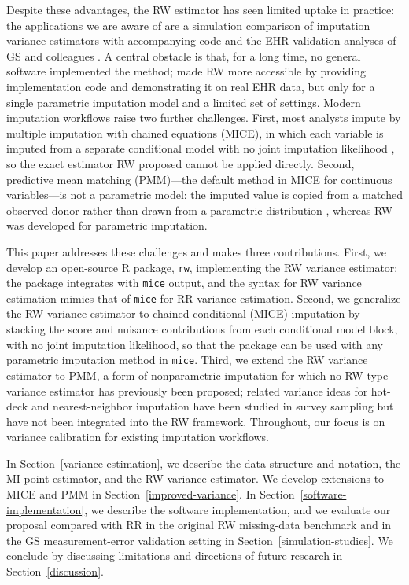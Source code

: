 Despite these advantages, the RW estimator has seen limited uptake in
practice: the applications we are aware of are a simulation comparison
of imputation variance estimators with accompanying code
\citep{hughes2016comparison} and the EHR validation analyses of GS and
colleagues \citep{giganti2020dependent, giganti2020multiple}.  A
central obstacle is that, for a long time, no general software
implemented the method; \citet{giganti2020multiple} made RW more
accessible by providing implementation code and demonstrating it on
real EHR data, but only for a single parametric imputation model and a
limited set of settings.  Modern imputation workflows raise two
further challenges.  First, most analysts impute by multiple
imputation with chained equations (MICE), in which each variable is
imputed from a separate conditional model with no joint imputation
likelihood \citep{vanbuuren2011mice}, so the exact estimator RW proposed
cannot be applied directly.  Second, predictive mean matching
(PMM)---the default method in MICE for continuous variables---is not a
parametric model: the imputed value is copied from a matched observed
donor rather than drawn from a parametric distribution
\citep{schenker1995partially, andridge2010review}, whereas RW was
developed for parametric imputation.

This paper addresses these challenges and makes three contributions.
First, we develop an open-source \textsf{R} package, \texttt{rw},
implementing the RW variance estimator; the package integrates with
\texttt{mice} output, and the syntax for RW variance estimation mimics
that of \texttt{mice} for RR variance estimation.  Second, we
generalize the RW variance estimator to chained conditional (MICE)
imputation by stacking the score and nuisance contributions from each
conditional model block, with no joint imputation likelihood, so that
the package can be used with any parametric imputation method in
\texttt{mice}.  Third, we extend the RW variance estimator to PMM, a
form of nonparametric imputation for which no RW-type variance
estimator has previously been proposed; related variance ideas for
hot-deck and nearest-neighbor imputation have been studied in survey
sampling
\citep{rao1992jackknife,chen2002common,kim2004fractional,yang2020pmm}
but have not been integrated into the RW framework.  Throughout, our
focus is on variance calibration for existing imputation workflows.

In Section~\ref{variance-estimation}, we describe the data structure
and notation, the MI point estimator, and the RW variance estimator.
We develop extensions to MICE and PMM in
Section~\ref{improved-variance}.  In
Section~\ref{software-implementation}, we describe the software
implementation, and we evaluate our proposal compared with RR in the
original RW missing-data benchmark and in the GS measurement-error
validation setting in Section~\ref{simulation-studies}.  We conclude by
discussing limitations and directions of future research in
Section~\ref{discussion}.